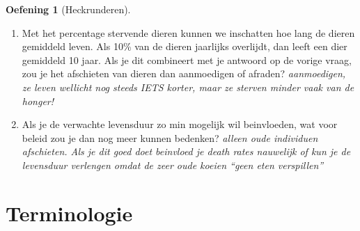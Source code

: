 \documentclass[
  a4paper,
]{scrbook}
\theoremstyle{definition}
\newtheorem{exercise}{Oefening}[chapter]
\theoremstyle{remark}
\begin{document}
\begin{exercise}[Heckrunderen]
\begin{enumerate}
  :::

  Bekijk het nieuwe dataframe met \texttt{View(tijdserie)}, en vergelijk
  het percentage sterfte in jaar 30 en 50. Wat valt je op? \emph{als ze
  goed kijken zien ze dat sterfte slechts 2.28 procent is toegenomen
  terwijl 5\% gekilled wordt. Kennelijk compenseert de verminderde
  density-dependence death dus inderdaad voor het killen!}
\item
  Met het percentage stervende dieren kunnen we inschatten hoe lang de
  dieren gemiddeld leven. Als 10\% van de dieren jaarlijks overlijdt,
  dan leeft een dier gemiddeld 10 jaar. Als je dit combineert met je
  antwoord op de vorige vraag, zou je het afschieten van dieren dan
  aanmoedigen of afraden? \emph{aanmoedigen, ze leven wellicht nog
  steeds IETS korter, maar ze sterven minder vaak van de honger!}
\item
  Als je de verwachte levensduur zo min mogelijk wil beinvloeden, wat
  voor beleid zou je dan nog meer kunnen bedenken? \emph{alleen oude
  individuen afschieten. Als je dit goed doet beinvloed je death rates
  nauwelijk of kun je de levensduur verlengen omdat de zeer oude koeien
  ``geen eten verspillen''}
\end{enumerate}

\end{exercise}

\hypertarget{terminologie-3}{%
\section{Terminologie}\label{terminologie-3}}
\end{document}
